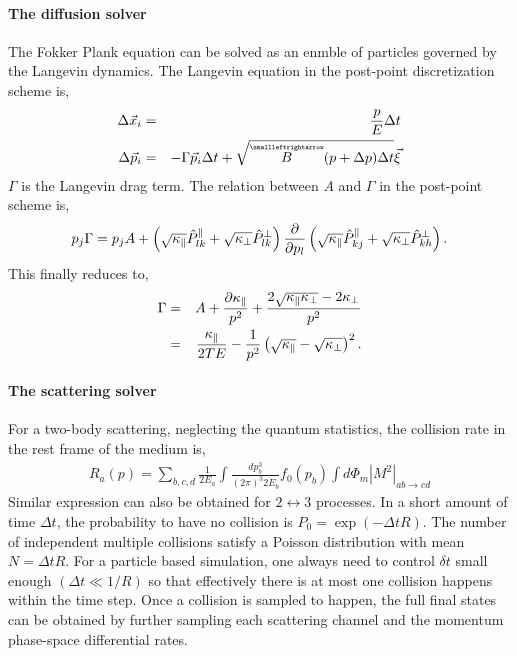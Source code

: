 \paragraph{The diffusion solver}
The Fokker Plank equation can be solved as an enmble of particles governed by the Langevin dynamics.
The Langevin equation in the post-point discretization scheme is,
\begin{eqnarray}
\Delta \vec{x}_i &=& \frac{p}{E}\Delta t\\
\Delta \vec{p}_i &=& -\Gamma \vec{p}_i \Delta t + \sqrt{\tensor{B}(p+\Delta p) \Delta t  }\vec{\xi}
\end{eqnarray}
$\Gamma$ is the Langevin drag term.
The relation between $A$ and $\Gamma$ in the post-point scheme is,
\begin{eqnarray}
p_j \Gamma  = p_jA + \left(\sqrt{\kappa_{\|}}\hat{P}^{\|}_{lk} + \sqrt{\kappa_{\perp}}\hat{P}^{\perp}_{lk}\right) \frac{\partial}{\partial p_l} \left( \sqrt{\kappa_{\|}}\hat{P}^{\|}_{kj} + \sqrt{\kappa_{\perp}}\hat{P}^{\perp}_{kh} \right).
\end{eqnarray}
This finally reduces to,
\begin{eqnarray}
\Gamma &=& A + \frac{\partial \kappa_{\|}}{p^2} + \frac{2\sqrt{\kappa_{\|}\kappa_{\perp}} - 2\kappa_{\perp}}{p^2} \\
 &=& \frac{\kappa_{\|}}{2TE} - \frac{1}{p^2}\left( \sqrt{\kappa_{\|}} - \sqrt{\kappa_{\perp}} \right)^2.
\end{eqnarray}

\paragraph{The scattering solver}
For a two-body scattering, neglecting the quantum statistics, the collision rate in the rest frame of the medium is,
\begin{eqnarray}
R_a(p) = \sum_{b,c,d}\frac{1}{2E_a}\int \frac{dp_b^3}{(2\pi)^3 2E_b} f_0(p_b) \int d\Phi_m |M^2|_{ab\rightarrow cd}
\end{eqnarray}
Similar expression can also be obtained for $2\leftrightarrow 3$ processes.
In a short amount of time $\Delta t$, the probability to have no collision is $P_{0} = \exp(-\Delta t R)$.
The number of independent multiple collisions satisfy a Poisson distribution with mean $N = \Delta t R$. 
For a particle based simulation, one always need to control $\delta t$ small enough $(\Delta t \ll 1/R)$ so that effectively there is at most one collision happens within the time step.
Once a collision is sampled to happen, the full final states can be obtained by further sampling each scattering channel and the momentum phase-space differential rates.

